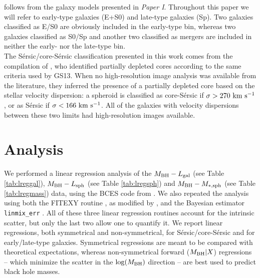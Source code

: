 \documentclass[preprint2]{emulateapj}
\begin{document}
follows from the galaxy models presented in \emph{Paper I}. 
Throughout this paper we will refer to early-type galaxies (E+S0) and late-type galaxies (Sp). 
Two galaxies classified as E/S0 are obviously included in the early-type bin, 
whereas two galaxies classified as S0/Sp and another two classified as mergers are included in neither the early- nor the late-type bin.\\
The S\'ersic/core-S\'ersic classification presented in this work 
comes from the compilation of \citet{savorgnangraham2015},
who identified partially depleted cores according to the same criteria used by GS13.
When no high-resolution image analysis was available from the literature, 
they inferred the presence of a partially depleted core based on the stellar velocity dispersion:
a spheroid is classified as core-S\'ersic if $\sigma > 270\rm~km~s^{-1}$,
or as S\'ersic if $\sigma < 166\rm~km~s^{-1}$. 
All of the galaxies with velocity dispersions between these two limits had high-resolution images available. 



\section{Analysis}
\label{sec:anal}
We performed a linear regression analysis of the $M_{\rm BH} - L_{\rm gal}$ (see Table \ref{tab:lreggal}), 
$M_{\rm BH} - L_{\rm sph}$ (see Table \ref{tab:lregsph}) and $M_{\rm BH} - M_{\rm *,sph}$ (see Table \ref{tab:lregmass}) data,
using the BCES code from \cite{akritasbershady1996}. 
We also repeated the analysis using both the FITEXY routine \citep{press1992}, as modified by \cite{tremaine2002}, 
and the Bayesian estimator {\tt linmix\_err} \citep{linmixerr}. 
All of these three linear regression routines account for the intrinsic scatter, 
but only the last two allow one to quantify it.
We report linear regressions, both symmetrical and non-symmetrical, 
for S\'ersic/core-S\'ersic and for early/late-type galaxies.
Symmetrical regressions are meant to be compared with theoretical expectations, 
whereas non-symmetrical forward ($M_{\rm BH}|X$) regressions -- 
which minimize the scatter in the $\log(M_{\rm BH})$ direction -- 
are best used to predict black hole masses.
\end{document}
